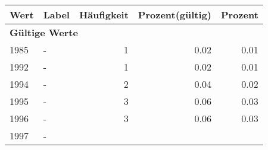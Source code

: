      \begin{longtable}{lXrrr}
     \toprule
     \textbf{Wert} & \textbf{Label} & \textbf{Häufigkeit} & \textbf{Prozent(gültig)} & \textbf{Prozent} \\
     \endhead
     \midrule
     \multicolumn{5}{l}{\textbf{Gültige Werte}}\\

     1985 &
     \multicolumn{1}{X}{ -  } &


       \num{1} &
       \num[round-mode=places,round-precision=2]{0,02} &
         \num[round-mode=places,round-precision=2]{0,01} \\

     1992 &
     \multicolumn{1}{X}{ -  } &


       \num{1} &
       \num[round-mode=places,round-precision=2]{0,02} &
         \num[round-mode=places,round-precision=2]{0,01} \\

     1994 &
     \multicolumn{1}{X}{ -  } &


       \num{2} &
       \num[round-mode=places,round-precision=2]{0,04} &
         \num[round-mode=places,round-precision=2]{0,02} \\

     1995 &
     \multicolumn{1}{X}{ -  } &


       \num{3} &
       \num[round-mode=places,round-precision=2]{0,06} &
         \num[round-mode=places,round-precision=2]{0,03} \\

     1996 &
     \multicolumn{1}{X}{ -  } &


       \num{3} &
       \num[round-mode=places,round-precision=2]{0,06} &
         \num[round-mode=places,round-precision=2]{0,03} \\

     1997 &
     \multicolumn{1}{X}{ -  } &



\end{longtable}
